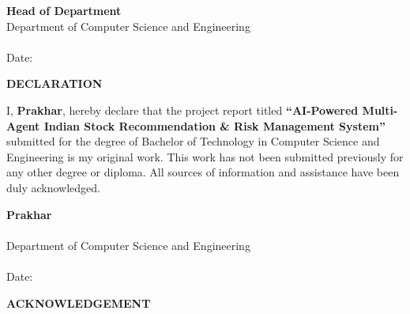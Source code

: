 \documentclass[12pt,a4paper]{report}
\begin{document}
\vspace{1cm}

\begin{flushleft}
    \textbf{Head of Department} \\
    Department of Computer Science and Engineering \\
    [Institute Name] \\
    Date: \underline{\hspace{4cm}}
\end{flushleft}

\newpage
\thispagestyle{empty}
\vspace*{3cm}
\begin{center}
    {\fontsize{16}{19.2}\bfseries DECLARATION\par}
\end{center}
\vspace{1.5cm}

\noindent I, \textbf{Prakhar}, hereby declare that the project report titled \textbf{``AI-Powered Multi-Agent Indian Stock Recommendation \& Risk Management System''} submitted for the degree of Bachelor of Technology in Computer Science and Engineering is my original work. This work has not been submitted previously for any other degree or diploma. All sources of information and assistance have been duly acknowledged.

\vspace{2cm}

\begin{flushright}
    \textbf{Prakhar} \\
    [Roll Number] \\
    Department of Computer Science and Engineering \\
    [Institute Name] \\
    Date: \underline{\hspace{4cm}}
\end{flushright}

\newpage
\thispagestyle{empty}
\vspace*{3cm}
\begin{center}
    {\fontsize{16}{19.2}\bfseries ACKNOWLEDGEMENT\par}
\end{center}
\vspace{1.5cm}
\end{document}
